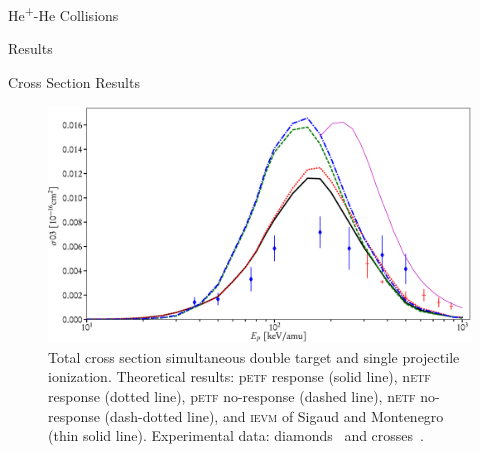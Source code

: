 \documentclass[letterpaper, 11 pt]{report}
\begin{document}
\begin{chapter}{\texorpdfstring{He\textsuperscript{+}}{He+}-He Collisions \label{chap:hephe}}
\begin{section}{Results \label{sec:hephe-disc}}
\begin{subsection}{Cross Section Results \label{sec:hephe-res}}
         \begin{figure}[t]
            \centering
            \includegraphics[width = \linewidth]{./images/hephe-cross/HepHe-003.eps}
            \caption[Total cross section simultaneous double target and single projectile ionization in
                     He\textsuperscript{+}-He collisions.]
                    {Total cross section simultaneous double target and single projectile ionization.
                     Theoretical results: p\textsc{etf} response (solid line), n\textsc{etf} response
                                          (dotted line), p\textsc{etf} no-response (dashed line),
                                          n\textsc{etf} no-response (dash-dotted line), and
                                          \textsc{ievm} of Sigaud and Montenegro~\cite{SM-03} (thin
                                          solid line).
                     Experimental data: diamonds~\cite{Dub-89} and crosses~\cite{SSMSM-11}.
                     \label{fig:cs003}}
         \end{figure}


\end{subsection}
\end{section}
\end{chapter}
\end{document}
